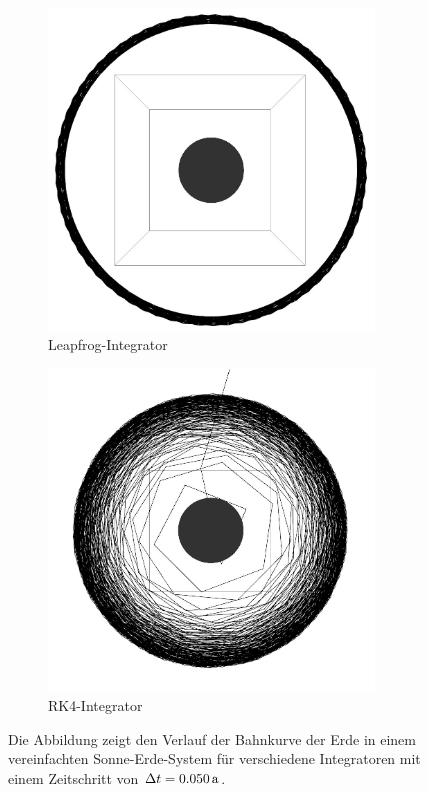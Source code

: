 \begin{figure}[p]
      \begin{subfigure}[b]{0.49\textwidth}
        \center
        \includegraphics[width=0.95\textwidth]{pictures/sun_earth/leapfrog_0_05.jpg}
        \caption{Leapfrog-Integrator}
      \end{subfigure}
      \begin{subfigure}[b]{0.49\textwidth}
        \center
        \includegraphics[width=0.95\textwidth]{pictures/sun_earth/rk4_0_05.jpg}
        \caption{RK4-Integrator}
      \end{subfigure}
      \caption{Die Abbildung zeigt den Verlauf der Bahnkurve der Erde in einem vereinfachten Sonne-Erde-System für verschiedene Integratoren mit einem Zeitschritt von $\Delta t = 0.050\,\mathrm{a}$.}
      \label{fig:sun-earth-5}
    \end{figure}

